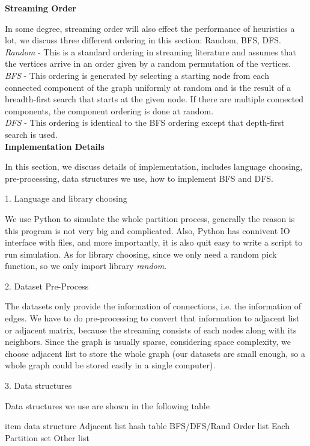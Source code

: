 \documentclass[12pt]{article}
\begin{document}
\textbf{Streaming Order}

In some degree, streaming order will also effect the performance of heuristics a lot, we discuss three different ordering in this section: Random, BFS, DFS.\\
\emph{Random} - This is a standard ordering in streaming literature and assumes that the vertices arrive in an
order given by a random permutation of the vertices.\\
\emph{BFS} - This ordering is generated by selecting a starting node from each connected component of the graph
uniformly at random and is the result of a breadth-first search that starts at the given node. If there are multiple
connected components, the component ordering is done at random.\\
\emph{DFS} - This ordering is identical to the BFS ordering except that depth-first search is used.\\


\textbf{Implementation Details}

In this section, we discuss details of implementation, includes language choosing, pre-processing, data structures we use, how to implement BFS and DFS.

1. Language and library choosing

We use Python to simulate the whole partition process, generally the reason is this program is not very big and complicated. Also, Python has connivent IO interface with files, and more importantly, it is also quit easy to write a script to run simulation.
As for library choosing, since we only need a random pick function, so we only import library \emph{random}.

2. Dataset Pre-Process

The datasets only provide the information of connections, i.e. the information of edges. We have to do pre-processing to convert that information to adjacent list or adjacent matrix, because the streaming consists of each nodes along with its neighbors. Since the graph is usually sparse, considering space complexity, we choose adjacent list to store the whole graph (our datasets are small enough, so a whole graph could be stored easily in a single computer).

3. Data structures

Data structures we use are shown in the following table

item                data structure
Adjacent list       hash table
BFS/DFS/Rand Order  list
Each Partition      set
Other               list
\end{document}
